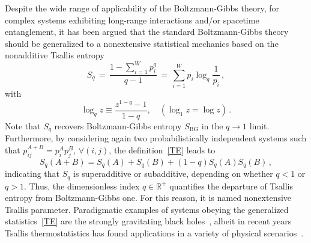 \documentclass[floats,prd,aps,amssymb,nofootinbib,showkeys]{revtex4}
\newcommand{\be}{\begin{equation}}\newcommand{\ee}{\end{equation}}
\begin{document}
Despite the wide range of applicability of the Boltzmann-Gibbs theory,
for complex systems exhibiting long-range
interactions and/or spacetime entanglement,  
it has been argued that the standard 
Boltzmann-Gibbs theory should be generalized
to a nonextensive statistical mechanics
based on the nonadditive Tsallis entropy~\cite{Tsallis1,Tsallis2,Tsallis3,Tsallis4}
\be
\label{TE}
S_q\,=\,\frac{1-\sum_{i=1}^Wp_i^q}{q-1}\,=\,\sum_{i=1}^Wp_i\log_q \frac{1}{p_i}\,,
\ee
with
\be
\log_q z \equiv \frac{z^{1-q}-1}{1-q}, \quad (\log_1 z=\log z)\,.
\ee
Note that $S_q$ recovers Boltzmann-Gibbs entropy 
$S_{\mathrm{BG}}$ in the $q\rightarrow1$ limit.
Furthermore, by considering again two probabilistically
independent systems such that $p_{ij}^{A+B}=p_{i}^Ap_{j}^B, 
\, \forall {(i,j)}$, the definition~\eqref{TE} leads to
\be
\label{sqab}
S_{q}(A+B)=S_q (A) + S_q (B) + (1-q) S_q (A) S_q(B)\,, 
\ee
indicating that $S_{q}$ is superadditive or subadditive, depending
on whether $q<1$ or $q>1$. Thus, the dimensionless
index $q\in\mathbb{R^+}$ quantifies the departure
of Tsallis entropy from 
Boltzmann-Gibbs one. For this reason, it is named
nonextensive Tsallis parameter. Paradigmatic 
examples of systems obeying the generalized
statistics~\eqref{TE} are the strongly
gravitating black holes~\cite{Tsallis3}, 
albeit in recent years Tsallis thermostatistics 
has found applications in a variety of physical scenarios~\cite{App1,App3,App7,App8,App11,App13,App14}.
\end{document}
